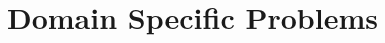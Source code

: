 \documentclass[10pt,openany,twoside,letterpaper,extrafontsizes]{memoir}
\newcommand{\myindex}[1]{%
\index[terms]{#1}%
}
\begin{document}
\begin{Spacing}{\arraysSpacing}
%
%
%
%
%
%

\end{Spacing}


\part{Domain Specific Problems}
\end{document}
